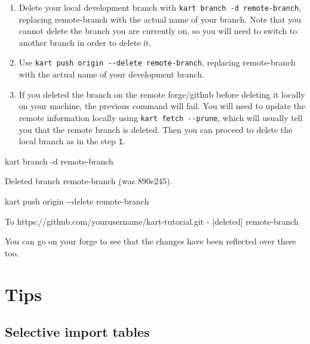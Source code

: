 \documentclass[
  letterpaper,
  DIV=11,
  numbers=noendperiod]{scrartcl}
\newenvironment{Shaded}{\begin{snugshade}}{\end{snugshade}}
\newcommand{\AttributeTok}[1]{\textcolor[rgb]{1.00,0.47,0.78}{#1}}
\newcommand{\BuiltInTok}[1]{\textcolor[rgb]{0.55,0.91,0.99}{#1}}
\newcommand{\ErrorTok}[1]{\textcolor[rgb]{1.00,0.33,0.33}{\underline{#1}}}
\newcommand{\ExtensionTok}[1]{\textcolor[rgb]{0.55,0.91,0.99}{#1}}
\newcommand{\KeywordTok}[1]{\textcolor[rgb]{1.00,0.47,0.78}{#1}}
\newcommand{\NormalTok}[1]{\textcolor[rgb]{0.97,0.97,0.95}{#1}}
\newcommand{\PreprocessorTok}[1]{\textcolor[rgb]{1.00,0.47,0.78}{#1}}
\newcommand{\SpecialStringTok}[1]{\textcolor[rgb]{0.95,0.98,0.55}{#1}}
\providecommand{\tightlist}{%
  \setlength{\itemsep}{0pt}\setlength{\parskip}{0pt}}\usepackage{longtable,booktabs,array}
\begin{document}
\begin{enumerate}
\def\labelenumi{\arabic{enumi}.}
\tightlist
\item
  Delete your local development branch with
  \texttt{kart\ branch\ -d\ remote-branch}, replacing remote-branch with
  the actual name of your branch. Note that you cannot delete the branch
  you are currently on, so you will need to switch to another branch in
  order to delete it.
\item
  Use \texttt{kart\ push\ origin\ -\/-delete\ remote-branch}, replacing
  remote-branch with the actual name of your development branch.
\item
  If you deleted the branch on the remote forge/github before deleting
  it locally on your machine, the previous command will fail. You will
  need to update the remote information locally using
  \texttt{kart\ fetch\ -\/-prune}, which will usually tell you that the
  remote branch is deleted. Then you can proceed to delete the local
  branch as in the step \texttt{1}.
\end{enumerate}

\begin{Shaded}
\begin{Highlighting}[]
\ExtensionTok{kart}\NormalTok{ branch }\AttributeTok{{-}d}\NormalTok{ remote{-}branch}

\ExtensionTok{Deleted}\NormalTok{ branch remote{-}branch }\ErrorTok{(}\ExtensionTok{was}\NormalTok{ 890e245}\KeywordTok{)}\BuiltInTok{.}

\ExtensionTok{kart}\NormalTok{ push origin }\AttributeTok{{-}{-}delete}\NormalTok{ remote{-}branch}

\ExtensionTok{To}\NormalTok{ https://github.com/yourusername/kart{-}tutorial.git}
 \ExtensionTok{{-}} \PreprocessorTok{[}\SpecialStringTok{deleted}\PreprocessorTok{]}\NormalTok{         remote{-}branch}
\end{Highlighting}
\end{Shaded}

You can go on your forge to see that the changes have been reflected
over there too.

\section{Tips}\label{tips}

\subsection{\texorpdfstring{\textbf{Selective import
tables}}{Selective import tables}}\label{selective-import-tables}
\end{document}
